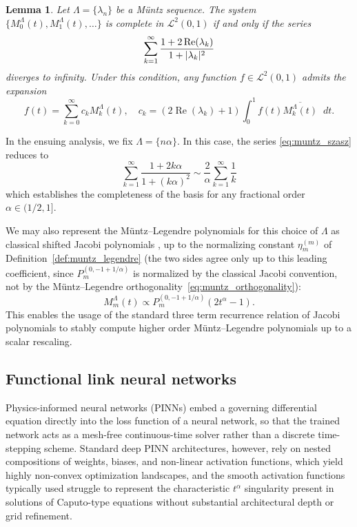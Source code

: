 \documentclass[11pt, a4paper]{article}
\theoremstyle{theoremstyle}
\newtheorem{lemma}[theorem]{Lemma}
\theoremstyle{definitionstyle}
\newcommand{\dd}{\mathop{}\!d}
\renewcommand{\Re}{\operatorname{Re}}
\DeclarePairedDelimiter{\abs}{\lvert}{\rvert}
\begin{document}
\begin{lemma}\label{lem:muntz_szasz_completeness}
Let $\Lambda = \{\lambda_n\}$ be a M\"untz sequence. The system $\{M_0^\Lambda(t), M_1^\Lambda(t), \dots\}$ is complete in $\mathcal L^2(0, 1)$ if and only if the series
\begin{equation}
    \sum_{k=1}^\infty \frac{1 + 2\Re (\lambda_k)}{1 + \abs{\lambda_k}^2}
    \label{eq:muntz_szasz}
\end{equation}
diverges to infinity. Under this condition, any function $f \in \mathcal L^2(0, 1)$ admits the expansion
\begin{equation}
    f(t) = \sum_{k=0}^\infty c_k M_k^\Lambda(t), \quad c_k = (2\Re(\lambda_k) + 1)\int_0^1 f(t)\overline{M_k^\Lambda(t)} \dd{t}.
\end{equation}
\end{lemma}

In the ensuing analysis, we fix $\Lambda = \{n\alpha\}$. In this case, the series \eqref{eq:muntz_szasz} reduces to
\begin{equation}
    \sum_{k=1}^\infty \frac{1 + 2k\alpha}{1 + (k\alpha)^2} \sim \frac{2}{\alpha}\sum_{k=1}^\infty \frac{1}{k}
\end{equation}
which establishes the completeness of the basis for any fractional order $\alpha \in (1/2, 1]$.

We may also represent the M\"untz--Legendre polynomials for this choice of $\Lambda$ as classical shifted Jacobi polynomials \cite{HOSSEINPOUR2019344}, up to the normalizing constant $\eta_m^{(m)}$ of Definition~\ref{def:muntz_legendre} (the two sides agree only up to this leading coefficient, since $P_m^{(0,-1+1/\alpha)}$ is normalized by the classical Jacobi convention, not by the M\"untz--Legendre orthogonality~\eqref{eq:muntz_orthogonality}):
\begin{equation}
    M_m^\Lambda(t) \propto P_m^{(0, -1 + 1/\alpha)}(2t^\alpha - 1).
\end{equation}
This enables the usage of the standard three term recurrence relation of Jacobi polynomials to stably compute higher order M\"untz--Legendre polynomials up to a scalar rescaling.

\subsection{Functional link neural networks}
Physics-informed neural networks (PINNs) embed a governing differential equation directly into the loss function of a neural network, so that the trained network acts as a mesh-free continuous-time solver rather than a discrete time-stepping scheme. Standard deep PINN architectures, however, rely on nested compositions of weights, biases, and non-linear activation functions, which yield highly non-convex optimization landscapes, and the smooth activation functions typically used struggle to represent the characteristic $t^\alpha$ singularity present in solutions of Caputo-type equations without substantial architectural depth or grid refinement.
\end{document}
